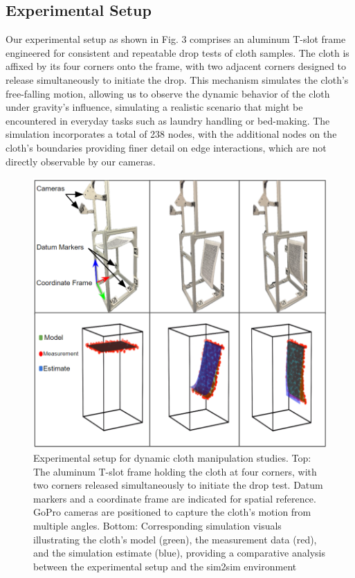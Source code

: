 \documentclass[subscriptcorrection,upint,varvw,barcolor=Goldenrod3,mathalfa=cal=euler,balance,hyphenate,french,pdf-a, nofoot]{asmejour} %
\begin{document}
\subsection{Experimental Setup}
Our experimental setup as shown in Fig. 3 comprises an aluminum T-slot frame engineered for consistent and repeatable drop tests of cloth samples. The cloth is affixed by its four corners onto the frame, with two adjacent corners designed to release simultaneously to initiate the drop. This mechanism simulates the cloth's free-falling motion, allowing us to observe the dynamic behavior of the cloth under gravity's influence, simulating a realistic scenario that might be encountered in everyday tasks such as laundry handling or bed-making. The simulation incorporates a total of 238 nodes, with the additional nodes on the cloth's boundaries providing finer detail on edge interactions, which are not directly observable by our cameras.
\begin{figure}[H]
\centering
\includegraphics[width=\linewidth]{CLOTH REPORT PICS/Setup.png} %
\caption{Experimental setup for dynamic cloth manipulation studies. Top: The aluminum T-slot frame holding the cloth at four corners, with two corners released simultaneously to initiate the drop test. Datum markers and a coordinate frame are indicated for spatial reference. GoPro cameras are positioned to capture the cloth's motion from multiple angles. Bottom: Corresponding simulation visuals illustrating the cloth's model (green), the measurement data (red), and the simulation estimate (blue), providing a comparative analysis between the experimental setup and the sim2sim environment}
\label{fig:yourlabel}
\end{figure}
\end{document}
